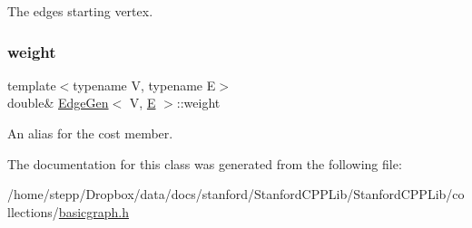 The edge\textquotesingle{}s starting vertex. 

\mbox{\label{classEdgeGen_a733c9bb212a183a48d27a4c38c07ba31}} 
\subsubsection{\texorpdfstring{weight}{weight}}
{\footnotesize\ttfamily template$<$typename V, typename E$>$ \\
double\& \mbox{\hyperlink{classEdgeGen}{Edge\+Gen}}$<$ V, \mbox{\hyperlink{gmath_8h_ab587ba72a9c23f238cb4fd70e2fdb545}{E}} $>$\+::weight}



An alias for the \textquotesingle{}cost\textquotesingle{} member. 



The documentation for this class was generated from the following file\+:\begin{DoxyCompactItemize}
\item 
/home/stepp/\+Dropbox/data/docs/stanford/\+Stanford\+C\+P\+P\+Lib/\+Stanford\+C\+P\+P\+Lib/collections/\mbox{\hyperlink{basicgraph_8h}{basicgraph.\+h}}\end{DoxyCompactItemize}
